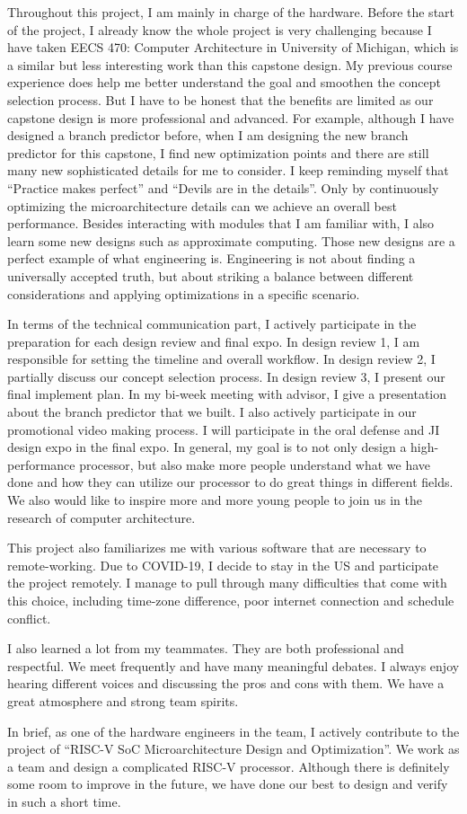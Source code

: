 Throughout this project, I am mainly in charge of the hardware. Before the start of the project, I already know the whole project is very challenging because I have taken EECS 470: Computer Architecture in University of Michigan, which is a similar but less interesting work than this capstone design. My previous course experience does help me better understand the goal and smoothen the concept selection process. But I have to be honest that the benefits are limited as our capstone design is more professional and advanced. For example, although I have designed a branch predictor before, when I am designing the new branch predictor for this capstone, I find new optimization points and there are still many new sophisticated details for me to consider. I keep reminding myself that ``Practice makes perfect'' and ``Devils are in the details''. Only by continuously optimizing the microarchitecture details can we achieve an overall best performance. Besides interacting with modules that I am familiar with, I also learn some new designs such as approximate computing. Those new designs are a perfect example of what engineering is. Engineering is not about finding a universally accepted truth, but about striking a balance between different considerations and applying optimizations in a specific scenario.

In terms of the technical communication part, I actively participate in the preparation for each design review and final expo. In design review 1, I am responsible for setting the timeline and overall workflow. In design review 2, I partially discuss our concept selection process. In design review 3, I present our final implement plan. In my bi-week meeting with advisor, I give a presentation about the branch predictor that we built. I also actively participate in our promotional video making process. I will participate in the oral defense and JI design expo in the final expo. In general, my goal is to not only design a high-performance processor, but also make more people understand what we have done and how they can utilize our processor to do great things in different fields. We also would like to inspire more and more young people to join us in the research of computer architecture.

This project also familiarizes me with various software that are necessary to remote-working. Due to COVID-19, I decide to stay in the US and participate the project remotely. I manage to pull through many difficulties that come with this choice, including time-zone difference, poor internet connection and schedule conflict.

I also learned a lot from my teammates. They are both professional and respectful. We meet frequently and have many meaningful debates. I always enjoy hearing different voices and discussing the pros and cons with them. We have a great atmosphere and strong team spirits.

In brief, as one of the hardware engineers in the team, I actively contribute to the project of ``RISC-V SoC Microarchitecture Design and Optimization''. We work as a team and design a complicated RISC-V processor. Although there is definitely some room to improve in the future, we have done our best to design and verify in such a short time.
